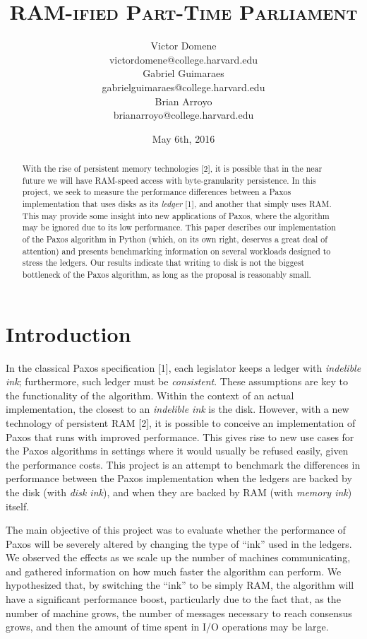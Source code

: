 \documentclass[12pt,]{article}
\title{\textsc{RAM-ified Part-Time Parliament}}
\author{Victor Domene \\ \small{victordomene@college.harvard.edu} \\ Gabriel Guimaraes \\ \small{gabrielguimaraes@college.harvard.edu} \\ Brian Arroyo \\ \small{brianarroyo@college.harvard.edu} \\ }
\date{May 6th, 2016}
\begin{document}
\maketitle
\begin{abstract}
With the rise of persistent memory technologies {[}2{]}, it is possible
that in the near future we will have RAM-speed access with
byte-granularity persistence. In this project, we seek to measure the
performance differences between a Paxos implementation that uses disks
as its \emph{ledger} {[}1{]}, and another that simply uses RAM. This may
provide some insight into new applications of Paxos, where the algorithm
may be ignored due to its low performance. This paper describes our
implementation of the Paxos algorithm in Python (which, on its own
right, deserves a great deal of attention) and presents benchmarking
information on several workloads designed to stress the ledgers. Our
results indicate that writing to disk is not the biggest bottleneck of
the Paxos algorithm, as long as the proposal is reasonably small.
\end{abstract}

{
\hypersetup{linkcolor=black}
\setcounter{tocdepth}{3}
\newpage
\tableofcontents
}

\newpage

\section{Introduction}\label{introduction}

In the classical Paxos specification {[}1{]}, each legislator keeps a
ledger with \emph{indelible ink}; furthermore, such ledger must be
\emph{consistent}. These assumptions are key to the functionality of the
algorithm. Within the context of an actual implementation, the closest
to an \emph{indelible ink} is the disk. However, with a new technology
of persistent RAM {[}2{]}, it is possible to conceive an implementation
of Paxos that runs with improved performance. This gives rise to new use
cases for the Paxos algorithms in settings where it would usually be
refused easily, given the performance costs. This project is an attempt
to benchmark the differences in performance between the Paxos
implementation when the ledgers are backed by the disk (with \emph{disk
ink}), and when they are backed by RAM (with \emph{memory ink}) itself.

The main objective of this project was to evaluate whether the
performance of Paxos will be severely altered by changing the type of
``ink'' used in the ledgers. We observed the effects as we scale up the
number of machines communicating, and gathered information on how much
faster the algorithm can perform. We hypothesized that, by switching the
``ink'' to be simply RAM, the algorithm will have a significant
performance boost, particularly due to the fact that, as the number of
machine grows, the number of messages necessary to reach consensus
grows, and then the amount of time spent in I/O operations may be large.
\end{document}
